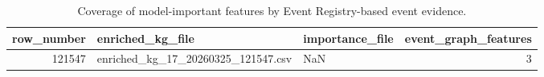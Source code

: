 \begin{table}
\caption{Coverage of model-important features by Event Registry-based event evidence.}
\label{tab:feature_event_coverage}
\begin{tabular}{rllr}
\toprule
row_number & enriched_kg_file & importance_file & event_graph_features \\
\midrule
121547 & enriched_kg_17_20260325_121547.csv & NaN & 3 \\
\bottomrule
\end{tabular}
\end{table}

